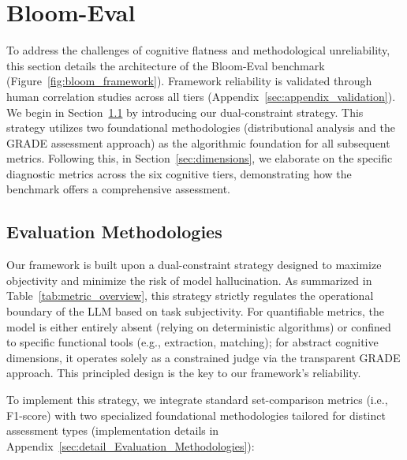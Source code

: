 \documentclass[11pt]{article}
\begin{document}
\section{Bloom-Eval}
\label{sec:bloom_eval}
To address the challenges of cognitive flatness and methodological unreliability, this section details the architecture of the Bloom-Eval benchmark (Figure~\ref{fig:bloom_framework}). Framework reliability is validated through human correlation studies across all tiers (Appendix~\ref{sec:appendix_validation}). We begin in Section~\ref{sec:Evaluation Methodologies} by introducing our dual-constraint strategy. This strategy utilizes two foundational methodologies (distributional analysis and the GRADE assessment approach) as the algorithmic foundation for all subsequent metrics. Following this, in Section~\ref{sec:dimensions}, we elaborate on the specific diagnostic metrics across the six cognitive tiers, demonstrating how the benchmark offers a comprehensive assessment.

\subsection{Evaluation Methodologies}
\label{sec:Evaluation Methodologies}
Our framework is built upon a dual-constraint strategy designed to maximize objectivity and minimize the risk of model hallucination. As summarized in Table~\ref{tab:metric_overview}, this strategy strictly regulates the operational boundary of the LLM based on task subjectivity. For quantifiable metrics, the model is either entirely absent (relying on deterministic algorithms) or confined to specific functional tools (e.g., extraction, matching); for abstract cognitive dimensions, it operates solely as a constrained judge via the transparent GRADE approach. This principled design is the key to our framework's reliability.

To implement this strategy, we integrate standard set-comparison metrics (i.e., F1-score) with two specialized foundational methodologies tailored for distinct assessment types (implementation details in Appendix~\ref{sec:detail_Evaluation_Methodologies}):
\end{document}
